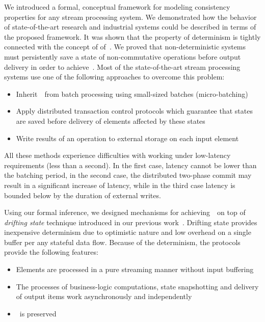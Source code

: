 
\label {fs-conclusion-seciton}

We introduced a formal, conceptual framework for modeling consistency properties for any stream processing system. We demonstrated how the behavior of state-of-the-art research and industrial systems could be described in terms of the proposed framework. It was shown that the property of determinism is tightly connected with the concept of of~\eo. We proved that non-deterministic systems must persistently save a state of non-commutative operations before output delivery in order to achieve~\eo. Most of the state-of-the-art stream processing systems use one of the following approaches to overcome this problem: 

\begin{itemize}
    \item Inherit~\eo\ from batch processing using small-sized batches (micro-batching)
    \item Apply distributed transaction control protocols which guarantee that states are saved before delivery of elements affected by these states
    \item Write results of an operation to external storage on each input element
\end{itemize}

All these methods experience difficulties with working under low-latency requirements (less than a second). In the first case, latency cannot be lower than the batching period, in the second case, the distributed two-phase commit may result in a significant increase of latency, while in the third case latency is bounded below by the duration of external writes.

Using our formal inference, we designed mechanisms for achieving~\eo\ on top of {\em drifting state} technique introduced in our previous work~\cite{we2018adbis}. Drifting state provides inexpensive determinism due to optimistic nature and low overhead on a single buffer per any stateful data flow. Because of the determinism, the protocols provide the following features:

\begin{itemize}
    \item Elements are processed in a pure streaming manner without input buffering
    \item The processes of business-logic computations, state snapshotting and delivery of output items work asynchronously and independently
    \item \Eo\ is preserved
\end{itemize}

